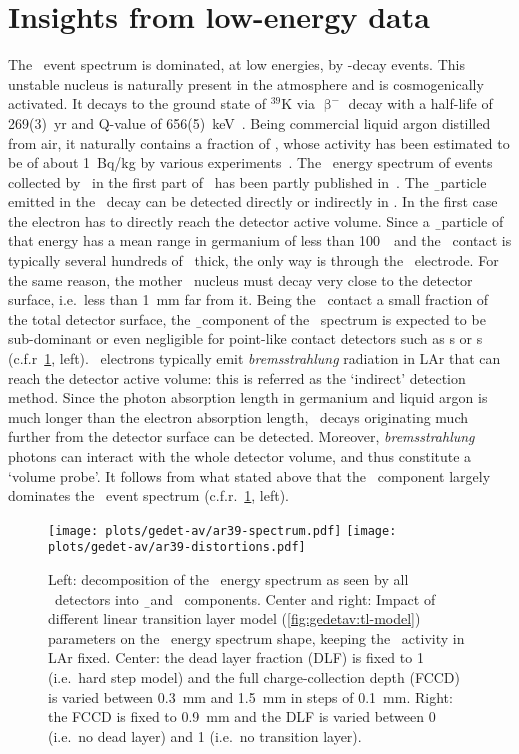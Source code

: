 \section{Insights from low-energy data}%
\label{sec:gedetav:ar39}

The \gerda\ event spectrum is dominated, at low energies, by \Arl-decay events. This
unstable nucleus is naturally present in the atmosphere and is cosmogenically activated.
It decays to the ground state of $^{39}$K via $\upbeta^-$ decay with a half-life of
269(3)~yr and Q-value of 656(5)~keV~\cite{Wang2017}. Being commercial liquid argon distilled from air, it
naturally contains a fraction of \Arl, whose activity has been estimated to be of about
1~Bq/kg by various experiments~\cite{Ajaj2019, Calvo2017, Benetti2006, Loosli1983}. The
\Arl\ energy spectrum of events collected by \gerda\ in the first part of \phasetwo\ has
been partly published in~\cite{Agostini2020}.
\newpar
The \b\ particle emitted in the \Arl\ decay can be detected directly or indirectly in
\gerda. In the first case the electron has to directly reach the detector active volume.
Since a \b\ particle of that energy has a mean range in germanium of less than 100~\mum\
and the \nplus\ contact is typically several hundreds of \mum\ thick, the only way is
through the \pplus\ electrode. For the same reason, the mother \Arl\ nucleus must decay
very close to the detector surface, i.e.~less than 1~mm far from it. Being the \pplus\
contact a small fraction of the total detector surface, the \b\ component of the \Arl\
spectrum is expected to be sub-dominant or even negligible for point-like contact
detectors such as \bege{}s or \icoax{}s (c.f.r~\cref{fig:gedetav:ar39:distortions}, left).
\newpar
\Arl\ electrons typically emit \emph{bremsstrahlung} radiation in LAr that can reach the
detector active volume: this is referred as the `indirect' detection method. Since the
photon absorption length in germanium and liquid argon is much longer than the electron
absorption length, \Arl\ decays originating much further from the detector surface can be
detected. Moreover, \emph{bremsstrahlung} photons can interact with the whole detector
volume, and thus constitute a `volume probe'. It follows from what stated above that the
\g\ component largely dominates the \Arl\ event spectrum
(c.f.r.~\cref{fig:gedetav:ar39:distortions}, left).

\begin{figure}
  \centering
  \texttt{[image: plots/gedet-av/ar39-spectrum.pdf]}%
  \texttt{[image: plots/gedet-av/ar39-distortions.pdf]}
  \caption{%
    Left: decomposition of the \Arl\ energy spectrum as seen by all \gerda\ detectors into
    \b\ and \g\ components. Center and right: Impact of different linear transition layer
    model (\cref{fig:gedetav:tl-model}) parameters on the \Arl\ energy spectrum shape,
    keeping the \Arl\ activity in LAr fixed. Center: the dead layer fraction (DLF) is fixed
    to 1 (i.e.~hard step model) and the full charge-collection depth (FCCD) is varied
    between 0.3~mm and 1.5~mm in steps of 0.1~mm. Right: the FCCD is fixed to 0.9~mm and
    the DLF is varied between 0 (i.e.~no dead layer) and 1 (i.e.~no transition layer).
  }\label{fig:gedetav:ar39:distortions}
\end{figure}

